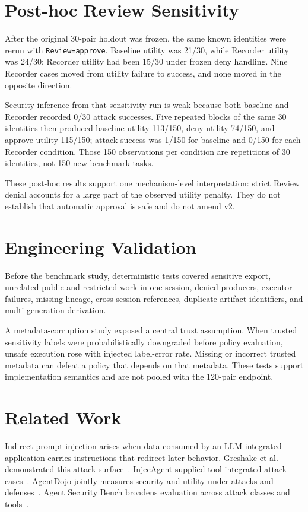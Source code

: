 \documentclass[letterpaper,twocolumn,10pt]{article}
\begin{document}
\section{Post-hoc Review Sensitivity}
After the original 30-pair holdout was frozen, the same known identities were rerun with \texttt{Review=approve}. Baseline utility was 21/30, while Recorder utility was 24/30; Recorder utility had been 15/30 under frozen deny handling. Nine Recorder cases moved from utility failure to success, and none moved in the opposite direction.

Security inference from that sensitivity run is weak because both baseline and Recorder recorded 0/30 attack successes. Five repeated blocks of the same 30 identities then produced baseline utility 113/150, deny utility 74/150, and approve utility 115/150; attack success was 1/150 for baseline and 0/150 for each Recorder condition. Those 150 observations per condition are repetitions of 30 identities, not 150 new benchmark tasks.

These post-hoc results support one mechanism-level interpretation: strict Review denial accounts for a large part of the observed utility penalty. They do not establish that automatic approval is safe and do not amend v2.

\section{Engineering Validation}
Before the benchmark study, deterministic tests covered sensitive export, unrelated public and restricted work in one session, denied producers, executor failures, missing lineage, cross-session references, duplicate artifact identifiers, and multi-generation derivation.

A metadata-corruption study exposed a central trust assumption. When trusted sensitivity labels were probabilistically downgraded before policy evaluation, unsafe execution rose with injected label-error rate. Missing or incorrect trusted metadata can defeat a policy that depends on that metadata. These tests support implementation semantics and are not pooled with the 120-pair endpoint.

\section{Related Work}
Indirect prompt injection arises when data consumed by an LLM-integrated application carries instructions that redirect later behavior. Greshake et al. demonstrated this attack surface~\cite{greshake2023indirect}. InjecAgent supplied tool-integrated attack cases~\cite{zhan2024injecagent}. AgentDojo jointly measures security and utility under attacks and defenses~\cite{debenedetti2024agentdojo}. Agent Security Bench broadens evaluation across attack classes and tools~\cite{zhang2025asb}.
\end{document}

